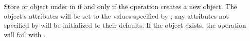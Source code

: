 Store or object under  in  if and only if the operation
creates a new object.  The object's attributes will be set to the values
specified by ; any attributes not specified by  will be
initialized to their defaults.  If the object exists, the operation will fail
with .
